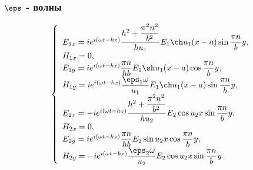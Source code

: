 \subsubsection{\(\boldsymbol{\eps}\) - волны}
\[
    \left\{
    \begin{array}{l}
        E_{1x} =i e^{i(\omega t - h z)}\frac{h^2 + \frac{\pi^2 n^2}{b^2}}
            {hu_1}E_1\ch u_1 (x-a) \sin \frac{\pi n}{b}y,\\
        H_{1x} = 0,\\
        E_{1y} = i e^{i(\omega t - h z)}\frac{\pi n}{hb}
            E_1\sh u_1 (x-a) \cos \frac{\pi n}{b}y,\\
        H_{1y} = i e^{i(\omega t - h z)}\frac{\eps_1\omega}{u_1}E_1
            \ch u_1 (x-a) \sin \frac{\pi n}{b}y,\\
        E_{2x} = -i e^{i(\omega t - h z)}\frac{h^2 + \frac{\pi^2 n^2}{b^2}}
        {hu_2}E_2\cos u_2 x \sin \frac{\pi n}{b}y,\\
        H_{2x} = 0,\\
        E_{2y} = i e^{i(\omega t - h z)}\frac{\pi n}{hb}
        E_2\sin u_2 x \cos \frac{\pi n}{b}y,\\
        H_{2y} = -i e^{i(\omega t - h z)} \frac{\eps_2\omega}{u_2}
        E_2\cos u_2 x \sin \frac{\pi n}{b}y.\\
    \end{array}
    \right.
\]
